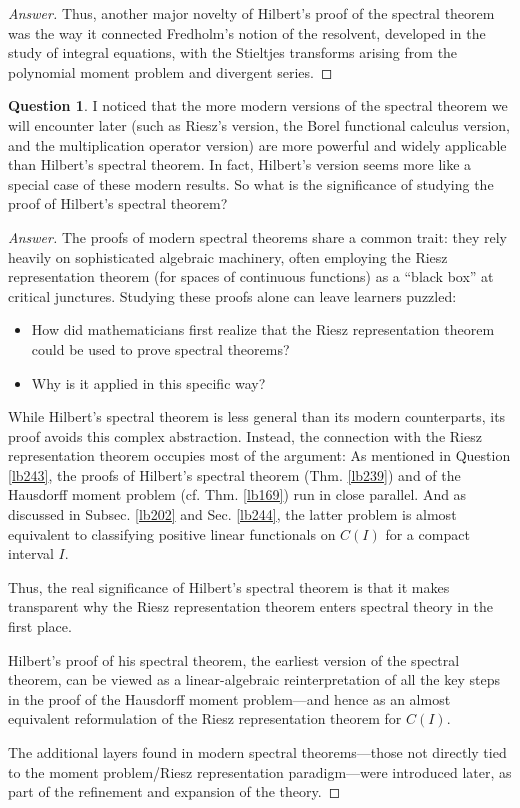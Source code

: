 \documentclass[12pt,b5paper,notitlepage]{article}
\theoremstyle{definition}
\newtheorem{question}[df]{Question}
\theoremstyle{plain}
\numberwithin{equation}{section}
\begin{document}
\begin{proof}[Answer]
Thus, another major novelty of Hilbert’s proof of the spectral theorem was the way it connected Fredholm’s notion of the resolvent, developed in the study of integral equations, with the Stieltjes transforms arising from the polynomial moment problem and divergent series.
\end{proof}


\begin{question}\label{lb250}
I noticed that the more modern versions of the spectral theorem we will encounter later (such as Riesz's version, the Borel functional calculus version, and the multiplication operator version) are more powerful and widely applicable than Hilbert's spectral theorem. In fact, Hilbert's version seems more like a special case of these modern results. So what is the significance of studying the proof of Hilbert's spectral theorem?
\end{question}


\begin{proof}[Answer]
The proofs of modern spectral theorems share a common trait: they rely heavily on sophisticated algebraic machinery, often employing the Riesz representation theorem (for spaces of continuous functions) as a ``black box'' at critical junctures. Studying these proofs alone can leave learners puzzled:
\begin{itemize}
\item How did mathematicians first realize that the Riesz representation theorem could be used to prove spectral theorems?
\item Why is it applied in this specific way?
\end{itemize}


While Hilbert's spectral theorem is less general than its modern counterparts, its proof avoids this complex abstraction. Instead, the connection with the Riesz representation theorem occupies most of the argument: As mentioned in Question \ref{lb243}, the proofs of Hilbert's spectral theorem (Thm. \ref{lb239}) and of the Hausdorff moment problem (cf. Thm. \ref{lb169}) run in close parallel. And as discussed in Subsec. \ref{lb202} and Sec. \ref{lb244}, the latter problem is almost equivalent to classifying positive linear functionals on $C(I)$ for a compact interval $I$.




Thus, the real significance of Hilbert's spectral theorem is that it makes transparent why the Riesz representation theorem enters spectral theory in the first place. 
\begin{tcolorbox}
Hilbert's proof of his spectral theorem, the earliest version of the spectral theorem, can be viewed as a linear-algebraic reinterpretation of all the key steps in the proof of the Hausdorff moment problem---and hence as an almost equivalent reformulation of the Riesz representation theorem for $C(I)$.
\end{tcolorbox}
\noindent The additional layers found in modern spectral theorems---those not directly tied to the moment problem/Riesz representation paradigm---were introduced later, as part of the refinement and expansion of the theory.
\end{proof}
\end{document}
